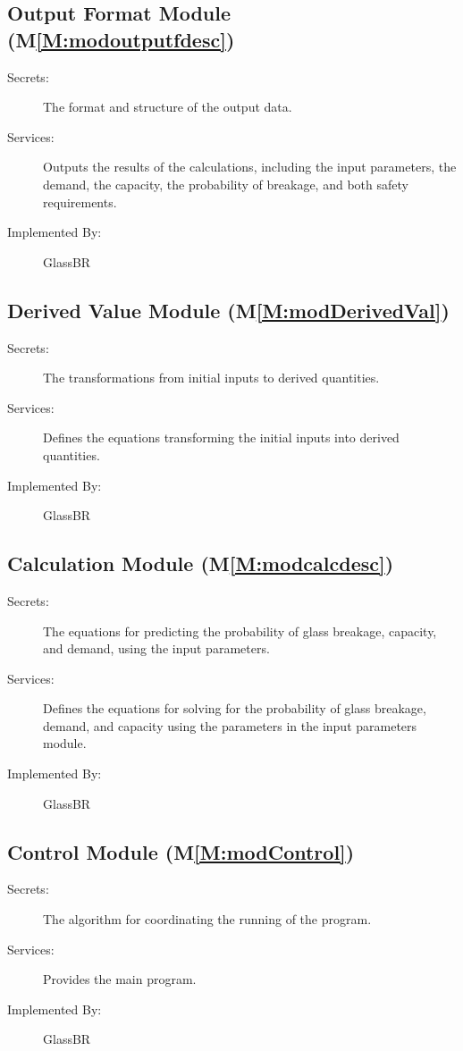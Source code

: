 \documentclass[12pt]{article}
\begin{document}
\subsection{Output Format Module (M\ref{M:modoutputfdesc})}
\label{Sec:OutpFormModu()}
\begin{description}
\item[Secrets:]The format and structure of the output data.
\item[Services:]Outputs the results of the calculations, including the input parameters, the demand, the capacity, the probability of breakage, and both safety requirements.
\item[Implemented By:]GlassBR
\end{description}
\subsection{Derived Value Module (M\ref{M:modDerivedVal})}
\label{Sec:DeriValuModu()}
\begin{description}
\item[Secrets:]The transformations from initial inputs to derived quantities.
\item[Services:]Defines the equations transforming the initial inputs into derived quantities.
\item[Implemented By:]GlassBR
\end{description}
\subsection{Calculation Module (M\ref{M:modcalcdesc})}
\label{Sec:CalcModu()}
\begin{description}
\item[Secrets:]The equations for predicting the probability of glass breakage, capacity, and demand, using the input parameters.
\item[Services:]Defines the equations for solving for the probability of glass breakage, demand, and capacity using the parameters in the input parameters module.
\item[Implemented By:]GlassBR
\end{description}
\subsection{Control Module (M\ref{M:modControl})}
\label{Sec:ContModu()}
\begin{description}
\item[Secrets:]The algorithm for coordinating the running of the program.
\item[Services:]Provides the main program.
\item[Implemented By:]GlassBR
\end{description}
\end{document}

